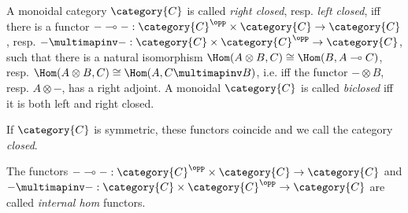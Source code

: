 \documentclass[DIN, pagenumber=false, fontsize=11pt, parskip=half, colorinlistoftodos, svgnames]{scrartcl}
\begin{document}
	
	\begin{definition}
		\label{def: closedMonoCat}
		A monoidal category $\category{C} $ is called \emph{right closed}, resp. \emph{left closed}, iff there is a functor 
		$- \multimap -: \category{C}^\opp \times \category{C} \rightarrow \category{C} $, 
		resp. 
		$- \multimapinv -: \category{C} \times \category{C}^\opp \rightarrow \category{C} $, 
		such that there is a natural isomorphism 
		$\Hom(A \otimes B, C) \cong \Hom(B, A\multimap C)$, 
		resp. 
		$\Hom(A \otimes B, C) \cong \Hom(A, C\multimapinv B)$,
		i.e. iff the functor $- \otimes B$, resp. $A \otimes - $, has a right adjoint.
		A monoidal $\category{C} $ is called \emph{biclosed} iff it is both left and right closed.
		
		
		If $\category{C} $ is symmetric, these functors coincide and we call the category \emph{closed}.
		
		The functors 
		$- \multimap -: \category{C}^\opp \times \category{C} \rightarrow \category{C} $ 
		and 
		$- \multimapinv -: \category{C} \times \category{C}^\opp \rightarrow \category{C} $
		are called \emph{internal hom} functors.
	\end{definition}
	
	
\end{document}
